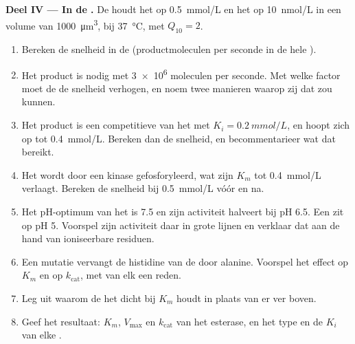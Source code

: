 \begin{problem}
\medskip
\noindent\textbf{Deel IV --- In de .}
De  houdt het  op \qty{0.5}{mmol/L} en het  op \qty{10}{nmol/L}
in een volume van \qty{1000}{\micro m^3}, bij \qty{37}{\celsius}, met
$Q_{10} = 2$.
\begin{enumerate}[resume]
  \item Bereken de snelheid in de  (productmoleculen per seconde in de
        hele ).
  \item Het product is nodig met \qty{3e6}{} moleculen per seconde. Met
        welke factor moet de  de snelheid verhogen, en noem twee
        manieren waarop zij dat zou kunnen.
  \item Het product is een competitieve  van het  met
        $K_i = \qty{0.2}{mmol/L}$, en hoopt zich op tot \qty{0.4}{mmol/L}.
        Bereken dan de snelheid, en becommentarieer wat dat bereikt.
  \item Het  wordt door een kinase gefosforyleerd, wat zijn $K_m$ tot
        \qty{0.4}{mmol/L} verlaagt. Bereken de snelheid bij
        \qty{0.5}{mmol/L}  vóór en na.
  \item Het pH-optimum van het  is 7.5 en zijn activiteit halveert bij
        pH 6.5. Een  zit op pH 5. Voorspel zijn activiteit daar in
        grote lijnen en verklaar dat aan de hand van ioniseerbare residuen.
  \item Een mutatie vervangt de histidine van de  door
        alanine. Voorspel het effect op $K_m$ en op $k_{\text{cat}}$, met
        van elk een reden.
  \item Leg uit waarom de  het  dicht bij $K_m$ houdt in plaats
        van er ver boven.
  \item Geef het resultaat: $K_m$, $V_{\max}$ en $k_{\text{cat}}$ van het
        esterase, en het type en de $K_i$ van elke .
\end{enumerate}
\end{problem}
